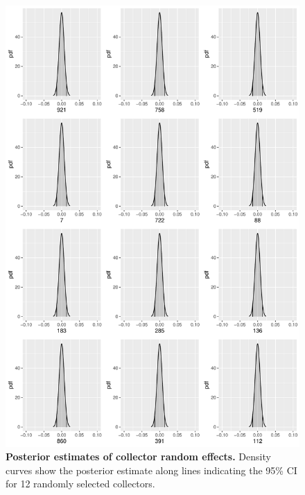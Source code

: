 \documentclass[11pt]{article}
\begin{document}
\begin{figure}[H]
	\centering
	\includegraphics[width = .8\linewidth]{../Plots/collector_posterior_plot.pdf}
	\caption{\textbf{Posterior estimates of collector random effects.} Density curves show the posterior estimate along lines indicating the 95\% CI for 12 randomly selected collectors.}
		\label{fig:collector_fx}
\end{figure}
\end{document}
